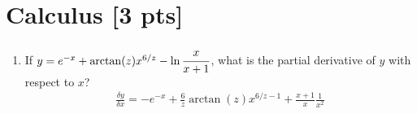 \documentclass[a4paper]{article}
\theoremstyle{definition}
\newenvironment{soln}{
	\leavevmode\color{blue}\ignorespaces
}{}
\begin{document}
	
	\section{Calculus [3 pts]}
	\begin{enumerate}
		\item If $y = e^{-x} + \arctan(z)x^{6/z} - \ln\cfrac{x}{x+1}$, what is the partial derivative of $y$ with respect to $x$?\\
		\begin{soln}  \begin{align*}
				\frac{\delta y}{\delta x} = -e^{-x} + \frac{6}{z}\arctan(z)x^{6/z-1} + \frac{x+1}{x} \frac{1}{x^2}
		\end{align*} \end{soln}
	\end{enumerate}
	
	
	
	
\end{document}
